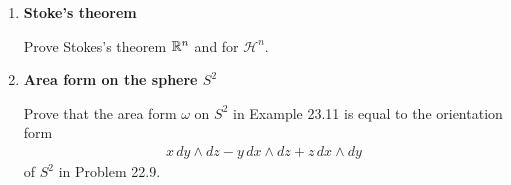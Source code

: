 \documentclass[12pt,a4paper]{report}
\begin{document}
\begin{enumerate}[label=23.\arabic*]
\item \textbf{Stoke's theorem}

Prove Stokes's theorem $\mathbb{R}^n$ and for $\mathcal{H}^n$.

\item \textbf{Area form on the sphere $S^2$}

Prove that the area form $\omega$ on $S^2$ in Example 23.11 is equal to the orientation form
\begin{align*}
	x\,dy\wedge dz-y \,dx\wedge dz+z\,dx\wedge dy
\end{align*}of $S^2$ in Problem 22.9.


\end{enumerate}
\end{document}
